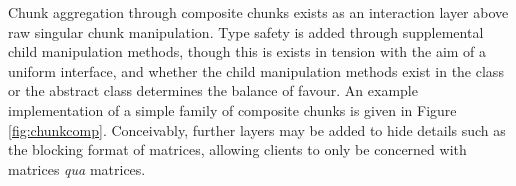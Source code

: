 \documentclass[10pt, a4paper]{article}
\begin{document}
Chunk aggregation through composite chunks exists as an interaction layer above raw singular chunk manipulation.
Type safety is added through supplemental child manipulation methods, though this is exists in tension with the aim of a uniform interface, and whether the child manipulation methods exist in the  class or the abstract  class determines the balance of favour.
An example implementation of a simple family of composite chunks is given in Figure \ref{fig:chunkcomp}.
Conceivably, further layers may be added to hide details such as the blocking format of matrices, allowing clients to only be concerned with matrices \textit{qua} matrices.


\end{document}
